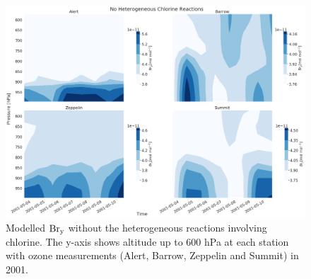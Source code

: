 \begin{figure}
    \centering
    \includegraphics[width = \linewidth]{Chapter6_Results/images/noCl_2001_bry.png}
    \caption{Modelled $\mathrm{Br_y}$ without the heterogeneous reactions involving chlorine. The y-axis shows altitude up to 600 hPa at each station with ozone measurements (Alert, Barrow, Zeppelin and Summit) in 2001.}
    \label{fig:vert_noCl_bry_2001}
\end{figure}